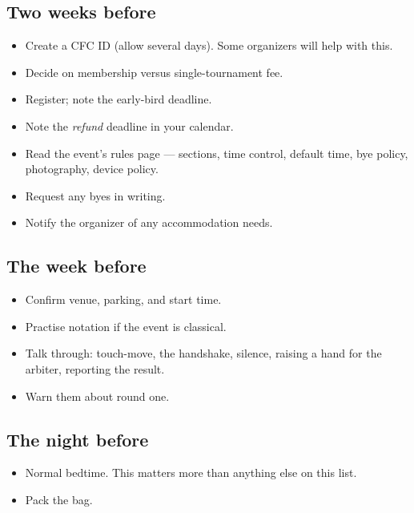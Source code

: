 \documentclass[10pt,letterpaper]{article}
\begin{document}
\subsection*{Two weeks before}
\begin{itemize}
  \item[$\square$] Create a CFC ID (allow several days). Some organizers will help with this. 
  \item[$\square$] Decide on membership versus single-tournament fee.
  \item[$\square$] Register; note the early-bird deadline.
  \item[$\square$] Note the \emph{refund} deadline in your calendar.
  \item[$\square$] Read the event's rules page --- sections, time control,
        default time, bye policy, photography, device policy.
  \item[$\square$] Request any byes in writing.
  \item[$\square$] Notify the organizer of any accommodation needs.
\end{itemize}

\subsection*{The week before}
\begin{itemize}
  \item[$\square$] Confirm venue, parking, and start time.
  \item[$\square$] Practise notation if the event is classical.
  \item[$\square$] Talk through: touch-move, the handshake, silence, raising a
        hand for the arbiter, reporting the result.
  \item[$\square$] Warn them about round one.
\end{itemize}

\subsection*{The night before}
\begin{itemize}
  \item[$\square$] Normal bedtime. This matters more than anything else on this
        list.
  \item[$\square$] Pack the bag.
\end{itemize}
\end{document}
